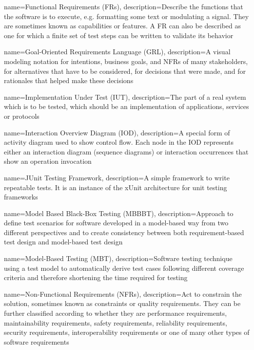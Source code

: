 {
	name={Functional Requirements (FRs)},
	description={Describe the functions that the software is to execute, e.g. formatting some text or modulating a signal. They are sometimes known as capabilities or features. A FR can also be described as one for which a finite set of test steps can be written to validate its behavior \cite{SWEBOK}}
}

{
	name={Goal-Oriented Requirements Language (GRL)},
	description={A visual modeling notation for intentions, business goals, and NFRs of many stakeholders, for alternatives that have to be considered, for decisions that were made, and for rationales that helped make these decisions \cite{Amyot2011}}
}

{
	name={Implementation Under Test (IUT)},
	description={The part of a real system which is to be tested, which should be an implementation of applications, services or protocols \cite{ETSI2021}}
}

{
	name={Interaction Overview Diagram (IOD)},
	description={A special form of activity diagram used to show control flow. Each node in the IOD represents either an interaction diagram (sequence diagrams) or interaction occurrences that show an operation invocation \cite{NajlaRaza2007}}
}

{
	name={JUnit Testing Framework},
	description={A simple framework to write repeatable tests. It is an instance of the xUnit architecture for unit testing frameworks \cite{JUnit4}}
}

{
	name={Model Based Black-Box Testing (MBBBT)},
	description={Approach to define test scenarios for software developed in a model-based way from two different perspectives and to create consistency between both requirement-based test design and model-based test design \cite{Conrad2005}}
}

{
	name={Model-Based Testing (MBT)},
	description={Software testing technique using a test model to automatically derive test cases following different coverage criteria and therefore shortening the time required for testing \cite{Paper1}}
}

{
	name={Non-Functional Requirements (NFRs)},
	description={Act to constrain the solution, sometimes known as constraints or quality requirements. They can be further classified according to whether they are performance requirements, maintainability requirements, safety requirements, reliability requirements, security requirements, interoperability requirements or one of many other types of software requirements \cite{SWEBOK}}
}

